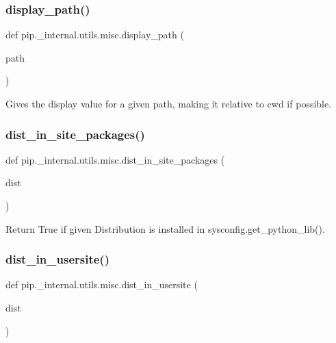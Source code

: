 \subsubsection{\texorpdfstring{display\+\_\+path()}{display\_path()}}
{\footnotesize\ttfamily def pip.\+\_\+internal.\+utils.\+misc.\+display\+\_\+path (\begin{DoxyParamCaption}\item[{}]{path }\end{DoxyParamCaption})}

\begin{DoxyVerb}Gives the display value for a given path, making it relative to cwd
if possible.\end{DoxyVerb}
 \mbox{\label{namespacepip_1_1__internal_1_1utils_1_1misc_a694d1df026fbd09121e544757995f124}} 
\subsubsection{\texorpdfstring{dist\+\_\+in\+\_\+site\+\_\+packages()}{dist\_in\_site\_packages()}}
{\footnotesize\ttfamily def pip.\+\_\+internal.\+utils.\+misc.\+dist\+\_\+in\+\_\+site\+\_\+packages (\begin{DoxyParamCaption}\item[{}]{dist }\end{DoxyParamCaption})}

\begin{DoxyVerb}Return True if given Distribution is installed in
sysconfig.get_python_lib().
\end{DoxyVerb}
 \mbox{\label{namespacepip_1_1__internal_1_1utils_1_1misc_ab48a27a21c982133f0bd2c10c7f6c45b}} 
\subsubsection{\texorpdfstring{dist\+\_\+in\+\_\+usersite()}{dist\_in\_usersite()}}
{\footnotesize\ttfamily def pip.\+\_\+internal.\+utils.\+misc.\+dist\+\_\+in\+\_\+usersite (\begin{DoxyParamCaption}\item[{}]{dist }\end{DoxyParamCaption})}

